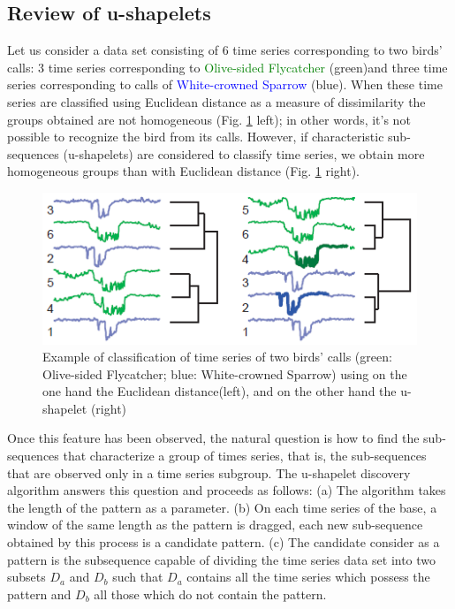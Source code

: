 \subsection{Review of u-shapelets}


Let us consider a data set consisting of 6 time series corresponding to two birds' calls: 3 time series corresponding to \textcolor{green}{Olive-sided Flycatcher} (green)and three time series corresponding to calls of \textcolor{blue}{White-crowned Sparrow} (blue). When these time series are classified using Euclidean distance as a measure of dissimilarity  the groups obtained are not homogeneous (Fig. \ref{US} left); in other words, it's not possible to recognize the bird from its calls. However, if  characteristic sub-sequences (u-shapelets) are considered  to classify time series, we obtain more homogeneous groups than with Euclidean distance (Fig. \ref{US} right).
  
 \begin{figure}[h]
  \centering
  \includegraphics[scale=0.65]{images/exemple_shapelet}
    \caption{Example of classification of time series of two birds' calls (green: Olive-sided Flycatcher; blue: White-crowned Sparrow) using on the one hand the Euclidean distance(left), and on the other hand the u-shapelet (right) \cite{ulanova2015scalable}}
  \label{US}
 \end{figure}
 

Once this feature has been observed, the natural question is how to find the sub-sequences that characterize a group of times series, that is, the sub-sequences that are observed only in a time series subgroup. The u-shapelet discovery algorithm answers this question and proceeds as follows: 
(a) The algorithm takes the length of the pattern as a parameter. (b)
On each time series of the base, a window of the same length as the pattern is dragged, each new sub-sequence obtained by this process is a candidate pattern. (c) The candidate consider as a pattern is the subsequence capable of dividing the time series data set into two subsets $D_a$ and $D_b$ such that $D_a$ contains all the time series which possess the pattern and $D_b$ all those which do not contain the pattern. 


